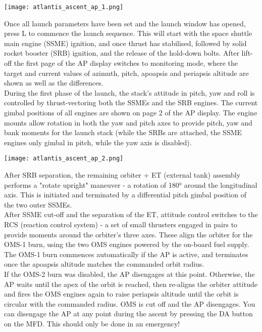 \documentclass[Orbiter User Manual.tex]{subfiles}
\begin{document}
\begin{center}
\texttt{[image: atlantis\_ascent\_ap\_1.png]}
\end{center}

Once all launch parameters have been set and the launch window has opened, press L to commence the launch sequence. This will start with the space shuttle main engine (SSME) ignition, and once thrust has stabilised, followed by solid rocket booster (SRB) ignition, and the release of the hold-down bolts.
After lift-off the first page of the AP display switches to monitoring mode, where the target and current values of azimuth, pitch, apoapsis and periapsis altitude are shown as well as the differences.\\

During the first phase of the launch, the stack's attitude in pitch, yaw and roll is controlled by thrust-vectoring both the SSMEs and the SRB engines. The current gimbal positions of all engines are shown on page 2 of the AP display. The engine mounts allow rotation in both the yaw and pitch axes to provide pitch, yaw and bank moments for the launch stack (while the SRBs are attached, the SSME engines only gimbal in pitch, while the yaw axis is disabled).\\

\begin{center}
\texttt{[image: atlantis\_ascent\_ap\_2.png]}
\end{center}

After SRB separation, the remaining orbiter + ET (external tank) assembly performs a "rotate upright" maneuver - a rotation of 180° around the longitudinal axis. This is initiated and terminated by a differential pitch gimbal position of the two outer SSMEs.\\

After SSME cut-off and the separation of the ET, attitude control switches to the RCS (reaction control system) - a set of small thrusters engaged in pairs to provide moments around the orbiter's three axes. These align the orbiter for the OMS-1 burn, using the two OMS engines powered by the on-board fuel supply. The OMS-1 burn commences automatically if the AP is active, and terminates once the apoapsis altitude matches the commanded orbit radius.\\

If the OMS-2 burn was disabled, the AP disengages at this point. Otherwise, the AP waits until the apex of the orbit is reached, then re-aligns the orbiter attitude and fires the OMS engines again to raise periapsis altitude until the orbit is circular with the commanded radius. OMS is cut off and the AP disengages.
You can disengage the AP at any point during the ascent by pressing the DA button on the MFD. This should only be done in an emergency!
\end{document}
